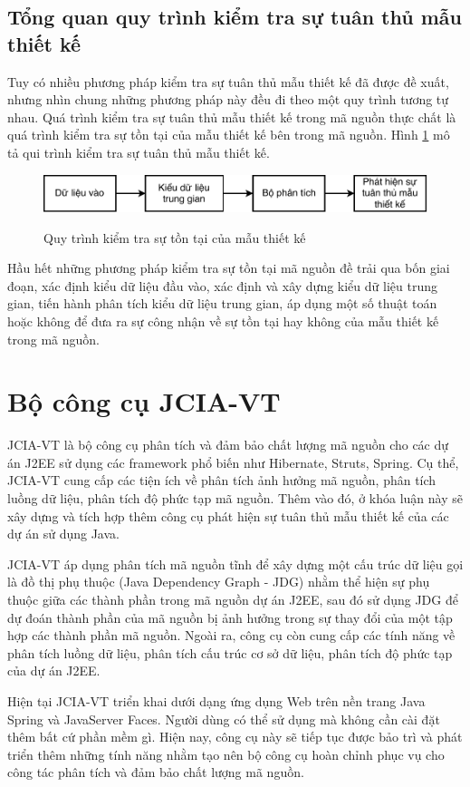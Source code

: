 \documentclass[12pt]{report}
\begin{document}
\subsection{Tổng quan quy trình kiểm tra sự tuân thủ mẫu thiết kế}
Tuy có nhiều phương pháp kiểm tra sự tuân thủ mẫu thiết kế đã được đề xuất, nhưng nhìn chung những phương pháp này đều đi theo một quy trình tương tự nhau. Quá trình kiểm tra sự tuân thủ mẫu thiết kế trong mã nguồn thực chất là quá trình kiểm tra sự tồn tại của mẫu thiết kế bên trong mã nguồn.
Hình \ref{fig:ddp_process} mô tả qui trình kiểm tra sự tuân thủ mẫu thiết kế.
\begin{figure}[h]
	\centering
	\includegraphics[scale=1]{images/ddp}
	\label{fig:ddp_process}
	\caption{Quy trình kiểm tra sự tồn tại của mẫu thiết kế}
\end{figure}
Hầu hết những phương pháp kiểm tra sự tồn tại mã nguồn đề trải qua bốn giai đoạn, xác định kiểu dữ liệu đầu vào, xác định và xây dựng kiểu dữ liệu trung gian, tiến hành phân tích kiểu dữ liệu trung gian, áp dụng một số thuật toán hoặc không để đưa ra sự công nhận về sự tồn tại hay không của mẫu thiết kế trong mã nguồn.

\section{Bộ công cụ JCIA-VT}
JCIA-VT \cite{jcia-vt} là bộ công cụ phân tích và đảm bảo chất lượng mã nguồn cho các dự án J2EE sử dụng các framework phổ biến như Hibernate, Struts, Spring. Cụ thể, JCIA-VT cung cấp các tiện ích về phân tích ảnh hưởng mã nguồn, phân tích luồng dữ liệu, phân tích độ phức tạp mã nguồn. Thêm vào đó, ở khóa luận này sẽ xây dựng và tích hợp thêm công cụ phát hiện sự tuân thủ mẫu thiết kế của các dự án sử dụng Java.

\noindent JCIA-VT áp dụng phân tích mã nguồn tĩnh để xây dựng một cấu trúc dữ liệu gọi là đồ thị phụ thuộc (Java Dependency Graph - JDG) nhằm thể hiện sự phụ thuộc giữa các thành phần trong mã nguồn dự án J2EE, sau đó sử dụng JDG để dự đoán thành phần của mã nguồn bị ảnh hưởng trong sự thay đổi của một tập hợp các thành phần mã nguồn. Ngoài ra, công cụ còn cung cấp các tính năng về phân tích luồng dữ liệu, phân tích cấu trúc cơ sở dữ liệu, phân tích độ phức tạp của dự án J2EE.

\noindent Hiện tại JCIA-VT triển khai dưới dạng ứng dụng Web trên nền trang Java Spring và JavaServer Faces.  Người dùng có thể sử dụng mà không cần cài đặt thêm bất cứ phần mềm gì. Hiện nay, công cụ này sẽ tiếp tục được bảo trì và phát triển thêm những tính năng nhằm tạo nên bộ công cụ hoàn chỉnh phục vụ cho công tác phân tích và đảm bảo chất lượng mã nguồn.
\end{document}
